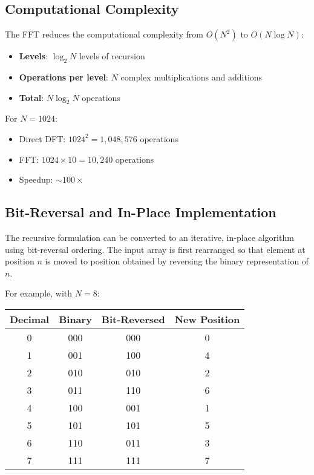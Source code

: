 \documentclass[11pt,a4paper]{article}
\begin{document}
\subsection{Computational Complexity}

The FFT reduces the computational complexity from $O(N^2)$ to $O(N \log N)$:

\begin{itemize}
    \item \textbf{Levels}: $\log_2 N$ levels of recursion
    \item \textbf{Operations per level}: $N$ complex multiplications and additions
    \item \textbf{Total}: $N \log_2 N$ operations
\end{itemize}

For $N = 1024$:
\begin{itemize}
    \item Direct DFT: $1024^2 = 1,048,576$ operations
    \item FFT: $1024 \times 10 = 10,240$ operations
    \item Speedup: $\sim 100\times$
\end{itemize}

\subsection{Bit-Reversal and In-Place Implementation}

The recursive formulation can be converted to an iterative, in-place algorithm using bit-reversal ordering. The input array is first rearranged so that element at position $n$ is moved to position obtained by reversing the binary representation of $n$.

For example, with $N = 8$:
\begin{center}
\begin{tabular}{|c|c|c|c|}
\hline
Decimal & Binary & Bit-Reversed & New Position \\
\hline
0 & 000 & 000 & 0 \\
1 & 001 & 100 & 4 \\
2 & 010 & 010 & 2 \\
3 & 011 & 110 & 6 \\
4 & 100 & 001 & 1 \\
5 & 101 & 101 & 5 \\
6 & 110 & 011 & 3 \\
7 & 111 & 111 & 7 \\
\hline
\end{tabular}
\end{center}
\end{document}

